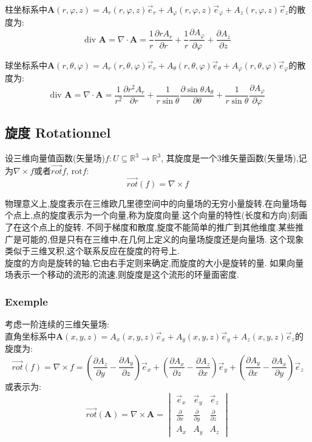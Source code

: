 \documentclass[12pt, a4paper, oneside]{ctexbook}
\newcommand{\R }{\mathbb{R}}%
\begin{document}
    柱坐标系中$\textbf{A}(r,\varphi ,z)=A_r(r,\varphi ,z)\vec{e}_r+A_\varphi(r,\varphi ,z)\vec{e}_\varphi+A_z(r,\varphi ,z)\vec{e}_z$的散度为:
    $$
      \text{div } \textbf{A}=\nabla \cdot \textbf{A}=\frac{1}{r}\frac{\partial rA_r}{\partial r}+\frac{1}{r}\frac{\partial A_\varphi}{\partial \varphi}+\frac{\partial A_z}{\partial z}
    $$

    球坐标系中$\textbf{A}(r,\theta ,\varphi)=A_r(r,\theta ,\varphi)\vec{e}_r+A_\theta(r,\theta ,\varphi)\vec{e}_\theta+A_\varphi(r,\theta ,\varphi)\vec{e}_\varphi$的散度为:
    $$
      \text{div } \textbf{A}=\nabla \cdot \textbf{A}=\frac{1}{r^2}\frac{\partial r^2A_r}{\partial r}+\frac{1}{r\sin \theta}\frac{\partial\sin\theta A_\theta}{\partial \theta}+\frac{1}{r\sin\theta}\frac{\partial A_\varphi}{\partial\varphi}
    $$
  \subsection{旋度 Rotationnel}
    设三维向量值函数(矢量场)$f:U\subseteq \R^3 \rightarrow \R^3$,
    其旋度是一个3维矢量函数(矢量场),记为$\nabla\times f$或者$\overrightarrow{rot}f$, $\text{rot} f$:
    $$
    \overrightarrow{rot} (f)=\nabla\times f
    $$

    物理意义上,旋度表示在三维欧几里德空间中的向量场的无穷小量旋转.在向量场每个点上,点的旋度表示为一个向量,称为旋度向量.这个向量的特性(长度和方向)刻画了在这个点上的旋转.
    不同于梯度和散度,旋度不能简单的推广到其他维度.某些推广是可能的,但是只有在三维中,在几何上定义的向量场旋度还是向量场.
    这个现象类似于三维叉积,这个联系反应在旋度的符号上.\\

    旋度的方向是旋转的轴,它由右手定则来确定,而旋度的大小是旋转的量.
    如果向量场表示一个移动的流形的流速,则旋度是这个流形的环量面密度.
    \subsubsection{Exemple}
    考虑一阶连续的三维矢量场:\\

    直角坐标系中$\textbf{A}(x,y,z)=A_x(x,y,z)\vec{e}_x+A_y(x,y,z)\vec{e}_y+A_z(x,y,z)\vec{e}_z$的旋度为:
    $$
    \overrightarrow{rot} (f)=\nabla\times f=(\frac{\partial A_z}{\partial y}-\frac{\partial A_y}{\partial z})\vec{e}_x+
    (\frac{\partial A_x}{\partial z}-\frac{\partial A_z}{\partial x})\vec{e}_y+(\frac{\partial A_y}{\partial x}-\frac{\partial A_x}{\partial y})\vec{e}_z
    $$
    或表示为:
    $$
    \overrightarrow{rot} (\textbf{A})=\nabla\times \textbf{A}=
    \begin{vmatrix}
      \vec{e}_x&\vec{e}_y  &\vec{e}_z \\
      \frac{\partial }{\partial x}& \frac{\partial }{\partial y} &\frac{\partial }{\partial z} \\
      A_x& A_y &A_z
    \end{vmatrix}
    $$
\end{document}
